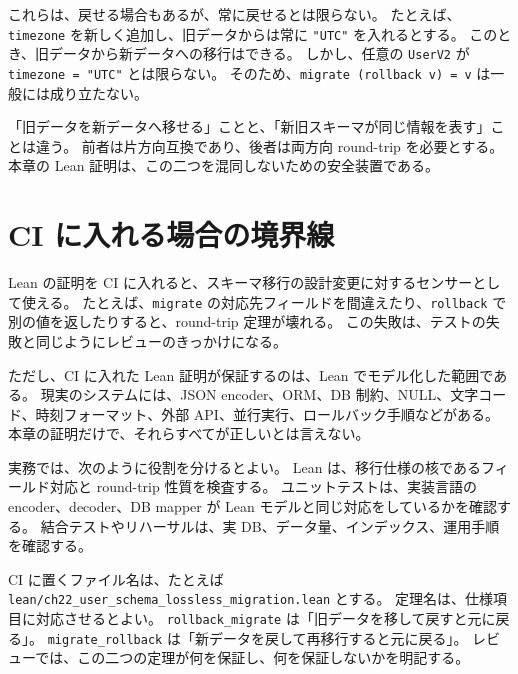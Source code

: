 これらは、戻せる場合もあるが、常に戻せるとは限らない。
たとえば、\texttt{timezone} を新しく追加し、旧データからは常に \texttt{"UTC"} を入れるとする。
このとき、旧データから新データへの移行はできる。
しかし、任意の \texttt{UserV2} が \texttt{timezone = "UTC"} とは限らない。
そのため、\texttt{migrate (rollback v) = v} は一般には成り立たない。

\begin{warningbox}
「旧データを新データへ移せる」ことと、「新旧スキーマが同じ情報を表す」ことは違う。
前者は片方向互換であり、後者は両方向 round-trip を必要とする。
本章の Lean 証明は、この二つを混同しないための安全装置である。
\end{warningbox}

\section{CI に入れる場合の境界線}

Lean の証明を CI に入れると、スキーマ移行の設計変更に対するセンサーとして使える。
たとえば、\texttt{migrate} の対応先フィールドを間違えたり、\texttt{rollback} で別の値を返したりすると、round-trip 定理が壊れる。
この失敗は、テストの失敗と同じようにレビューのきっかけになる。


ただし、CI に入れた Lean 証明が保証するのは、Lean でモデル化した範囲である。
現実のシステムには、JSON encoder、ORM、DB 制約、NULL、文字コード、時刻フォーマット、外部 API、並行実行、ロールバック手順などがある。
本章の証明だけで、それらすべてが正しいとは言えない。

\begin{softwarebox}
実務では、次のように役割を分けるとよい。
Lean は、移行仕様の核であるフィールド対応と round-trip 性質を検査する。
ユニットテストは、実装言語の encoder、decoder、DB mapper が Lean モデルと同じ対応をしているかを確認する。
結合テストやリハーサルは、実 DB、データ量、インデックス、運用手順を確認する。
\end{softwarebox}

CI に置くファイル名は、たとえば \texttt{lean/ch22\_user\_schema\_lossless\_migration.lean} とする。
定理名は、仕様項目に対応させるとよい。
\texttt{rollback\_migrate} は「旧データを移して戻すと元に戻る」。
\texttt{migrate\_rollback} は「新データを戻して再移行すると元に戻る」。
レビューでは、この二つの定理が何を保証し、何を保証しないかを明記する。

